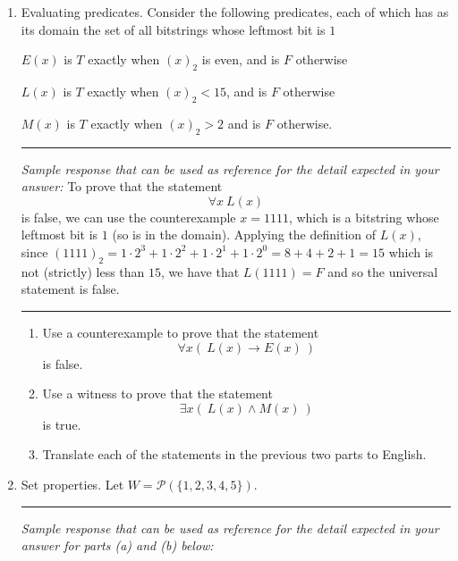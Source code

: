 \begin{enumerate}[labelindent=0pt, leftmargin=0pt]
    \item  Evaluating predicates. Consider the following predicates, each of which has 
    as its domain the set of all bitstrings whose leftmost bit is $1$
    
    $E(x)$ is $T$ exactly when $(x)_{2}$ is even, and is $F$ otherwise
    
    $L(x)$ is $T$ exactly when $(x)_2 < 15$, and is $F$ otherwise
    
    $M(x)$ is $T$ exactly when $(x)_2 > 2$ and is $F$ otherwise.
    
    
    \rule{0.5\textwidth}{.4pt}
    
    {\it Sample response that can be used as reference for the detail expected 
    in your answer:} To prove that the statement $$\forall x ~L(x)$$ is false, we can use 
    the counterexample $x = 1111$, which is a bitstring whose leftmost bit is $1$ (so is in the domain).
    Applying the definition of $L(x)$, since $(1111)_2 = 1 \cdot 2^3 + 1\cdot 2^2 + 1 \cdot 2^1 + 1 \cdot 2^0 = 8 + 4+2+1 = 15$
    which is not (strictly) less than $15$, we have that $L(1111) = F$ and so the universal statement is false.
    
    
    \rule{0.5\textwidth}{.4pt}
    
    
    
    \begin{enumerate}
    \item\gradeCorrectFirst Use a counterexample to prove that the statement
    \[
    \forall x ( ~L(x) \to E(x)~)
    \]
    is false.
    
    \item\gradeCorrect Use a witness to prove that the statement
    \[
    \exists x (~L(x) \land M(x) ~)
    \]
    is true.
    
    \item\gradeCompleteFirst Translate each of the statements in the previous two
    parts to English.
    \end{enumerate}


    \item Set properties. Let $W = \mathcal{P}(\{1,2,3,4,5\})$. 


    \rule{0.5\textwidth}{.4pt}
    
    {\it Sample response that can be used as reference for the detail expected 
    in your answer for parts (a) and (b) below:} 
    

\end{enumerate}
